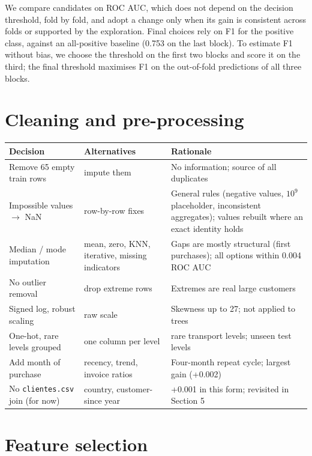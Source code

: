 \documentclass[10pt,a4paper]{article}
\begin{document}
We compare candidates on ROC AUC, which does not depend on the decision threshold, fold by fold, and adopt a change only when its gain is consistent across folds or supported by the exploration. Final choices rely on F1 for the positive class, against an all-positive baseline (0.753 on the last block). To estimate F1 without bias, we choose the threshold on the first two blocks and score it on the third; the final threshold maximises F1 on the out-of-fold predictions of all three blocks.

\section{Cleaning and pre-processing}

{\small
\begin{tabularx}{\linewidth}{@{}>{\raggedright\arraybackslash}p{3.6cm}>{\raggedright\arraybackslash}p{3.4cm}>{\raggedright\arraybackslash}X@{}}
\toprule
\textbf{Decision} & \textbf{Alternatives} & \textbf{Rationale} \\ \midrule
Remove 65 empty train rows & impute them & No information; source of all duplicates \\
Impossible values $\to$ NaN & row-by-row fixes & General rules (negative values, $10^9$ placeholder, inconsistent aggregates); values rebuilt where an exact identity holds \\
Median / mode imputation & mean, zero, KNN, iterative, missing indicators & Gaps are mostly structural (first purchases); all options within 0.004 ROC AUC \\
No outlier removal & drop extreme rows & Extremes are real large customers \\
Signed log, robust scaling & raw scale & Skewness up to 27; not applied to trees \\
One-hot, rare levels grouped & one column per level & 57 rare transport levels; unseen test levels \\
Add month of purchase & recency, trend, invoice ratios & Four-month repeat cycle; largest gain (+0.002) \\
No \texttt{clientes.csv} join (for now) & country, customer-since year & +0.001 in this form; revisited in Section 5 \\
\bottomrule
\end{tabularx}}

\section{Feature selection}
\end{document}
